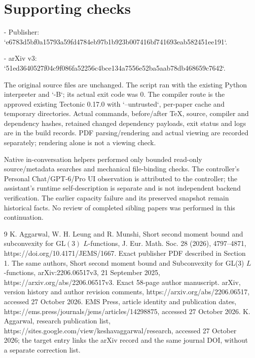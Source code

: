 \documentclass[10pt]{article}
\begin{document}
\section*{Supporting checks}
- Publisher: `e6783d5bf0a15793a59fd4784eb97b1b923b007416bf741693eab582451ee191`.\par
- arXiv v3: `51ed3640527f04c9f086fa52256c4bce134a7556e52ba5aab78db468659c7642`.\par
The original source files are unchanged. The script ran with the existing Python interpreter and `-B`; its actual exit code was 0. The compiler route is the approved existing Tectonic 0.17.0 with `–untrusted`, per-paper cache and temporary directories. Actual commands, before/after TeX, source, compiler and dependency hashes, retained changed dependency payloads, exit status and logs are in the build records. PDF parsing/rendering and actual viewing are recorded separately; rendering alone is not a viewing check.\par
Native in-conversation helpers performed only bounded read-only source/metadata searches and mechanical file-binding checks. The controller’s Personal Chat/GPT-6/Pro UI observation is attributed to the controller; the assistant’s runtime self-description is separate and is not independent backend verification. The earlier capacity failure and its preserved snapshot remain historical facts. No review of completed sibling papers was performed in this continuation.\par
9 K. Aggarwal, W. H. Leung and R. Munshi, Short second moment bound and subconvexity for \(\mathrm{GL}(3)\) \(L\)-functions, J. Eur. Math. Soc. 28 (2026), 4797–4871, https://doi.org/10.4171/JEMS/1667. Exact publisher PDF described in Section 1. The same authors, Short second moment bound and Subconvexity for GL(3) \(L\)-functions, arXiv:2206.06517v3, 21 September 2025, https://arxiv.org/abs/2206.06517v3. Exact 58-page author manuscript. arXiv, version history and author revision comments, https://arxiv.org/abs/2206.06517, accessed 27 October 2026. EMS Press, article identity and publication dates, https://ems.press/journals/jems/articles/14298875, accessed 27 October 2026. K. Aggarwal, research publication list, https://sites.google.com/view/keshavaggarwal/research, accessed 27 October 2026; the target entry links the arXiv record and the same journal DOI, without a separate correction list.\par
\end{document}
